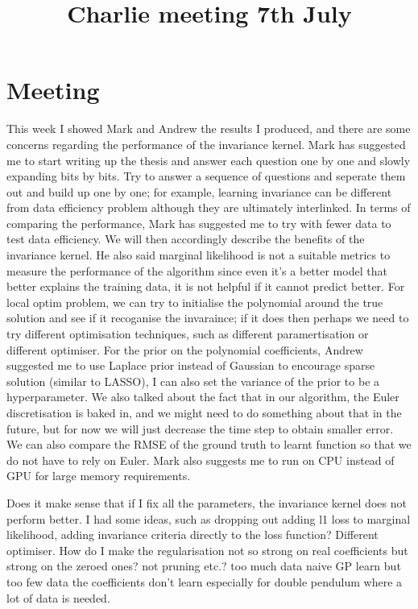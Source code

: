 \documentclass{article}
\title{\vspace{-3cm}Charlie meeting 7th July\vspace{-3em}}
\author{}
\date{}
\begin{document}
\maketitle
\section*{Meeting}
This week I showed Mark and Andrew the results I produced, and there are some concerns regarding the performance of the invariance kernel. 
Mark has suggested me to start writing up the thesis and answer each question one by one and slowly expanding bits by bits. 
Try to answer a sequence of questions and seperate them out and build up one by one; for example, learning invariance can be different from data efficiency problem although they are ultimately interlinked.  
In terms of comparing the performance, Mark has suggested me to try with fewer data to test data efficiency. 
We will then accordingly describe the benefits of the invariance kernel.
He also said marginal likelihood is not a suitable metrics to measure the performance of the algorithm since even it's a better model that better explains the training data, it is not helpful if it cannot predict better. 
For local optim problem, we can try to initialise the polynomial around the true solution and see if it recoganise the invaraince; if it does then perhaps we need to try different optimisation techniques, such as different paramertisation or different optimiser. 
For the prior on the polynomial coefficients, Andrew suggested me to use Laplace prior instead of Gaussian to encourage sparse solution (similar to LASSO), I can also set the variance of the prior to be a hyperparameter.
We also talked about the fact that in our algorithm, the Euler discretisation is baked in, and we might need to do something about that in the future, but for now we will just decrease the time step to obtain smaller error. 
We can also compare the RMSE of the ground truth to learnt function so that we do not have to rely on Euler.
Mark also suggests me to run on CPU instead of GPU for large memory requirements.

Does it make sense that if I fix all the parameters, the invariance kernel does not perform better.
I had some ideas, such as dropping out adding l1 loss to marginal likelihood, adding invariance criteria directly to the loss function? Different optimiser.
How do I make the regularisation not so strong on real coefficients but strong on the zeroed ones?
not pruning etc.?
too much data naive GP learn but too few data the coefficients don't learn especially for double pendulum where a lot of data is needed.
\end{document}
